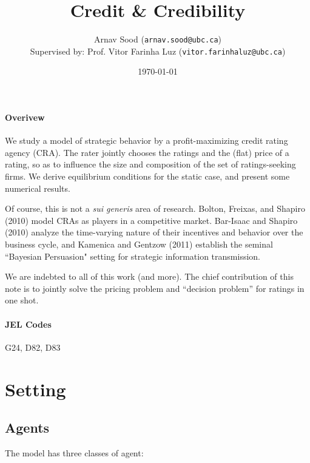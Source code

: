 \documentclass{article}
\title{Credit \& Credibility }
\author{Arnav Sood (\texttt{arnav.sood@ubc.ca}) \\ \normalsize Supervised by: Prof. Vitor Farinha Luz (\texttt{vitor.farinhaluz@ubc.ca})}
\date{\today}
\theoremstyle{definition}
\begin{document}
\maketitle

\paragraph*{Overivew} We study a model of strategic behavior by a profit-maximizing credit rating agency (CRA). The rater jointly chooses the ratings and the (flat) price of a rating, so as to influence the size and composition of the set of ratings-seeking firms. We derive equilibrium conditions for the static case, and present some numerical results. 

Of course, this is not a \emph{sui generis} area of research. Bolton, Freixas, and Shapiro (2010) model CRAs as players in a competitive market. Bar-Isaac and Shapiro (2010) analyze the time-varying nature of their incentives and behavior over the business cycle, and Kamenica and Gentzow (2011) establish the seminal ``Bayesian Persuasion" setting for strategic information transmission. 

We are indebted to all of this work (and more). The chief contribution of this note is to jointly solve the pricing problem and ``decision problem'' for ratings in one shot.

\paragraph*{JEL Codes} G24, D82, D83

\newpage

\tableofcontents

\newpage

\section{Setting}

\subsection{Agents}

The model has three classes of agent: 
\end{document}
